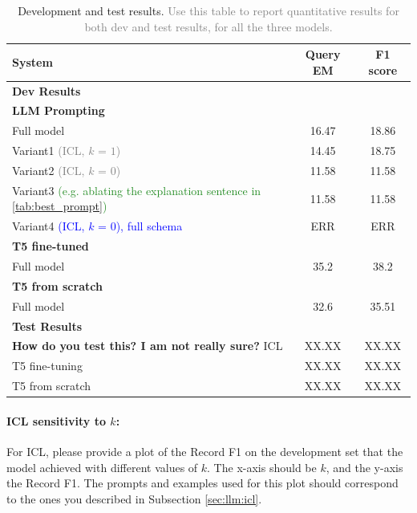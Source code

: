 \documentclass{article}
\begin{document}
\begin{table}[h!]
\centering
\begin{tabular}{lcc}
  \toprule
  System & Query EM & F1 score\\
  \midrule
  \multicolumn{3}{l}{\textbf{Dev Results}} \\
  \midrule
  \multicolumn{3}{l}{\textbf{LLM Prompting}} \\
  Full model & 16.47 & 18.86 \\ 
  Variant1 \textcolor{gray}{(ICL, $k$ = $1$)} & 14.45 & 18.75 \\
  Variant2 \textcolor{gray}{(ICL, $k$ = $0$)} & 11.58 & 11.58 \\
  Variant3 \textcolor{ForestGreen}{(e.g. ablating the explanation sentence in \autoref{tab:best_prompt})} & 11.58 & 11.58 \\
  Variant4 \textcolor{Blue}{(ICL, $k$ = $0$), full schema} & ERR & ERR \\
  \multicolumn{3}{l}{\textbf{T5 fine-tuned}} \\
  Full model & 35.2 & 38.2 \\[5pt]
  
  \multicolumn{3}{l}{\textbf{T5 from scratch}} \\
  Full model & 32.6 & 35.51 \\ 

  \midrule
  \multicolumn{3}{l}{\textbf{Test Results}} \\
  \midrule
  \textbf{How do you test this? I am not really sure?}
  ICL & XX.XX & XX.XX \\ 
  T5 fine-tuning & XX.XX & XX.XX \\
  T5 from scratch & XX.XX & XX.XX \\
  \bottomrule
\end{tabular}  
\caption{Development and test results. \textcolor{gray}{Use this table to report quantitative results for both dev and test results, for all the three models.}}
\label{tab:results}
\end{table}


\paragraph{ICL sensitivity to $k$:} For ICL, please provide a plot of the Record F1 on the development set that the model achieved with different values of $k$. The x-axis should be $k$, and the y-axis the Record F1. The prompts and examples used for this plot should correspond to the ones you described in Subsection \ref{sec:llm:icl}.
\end{document}
